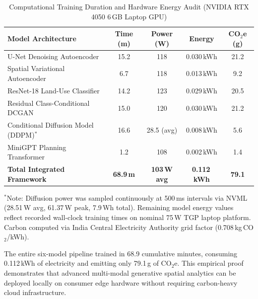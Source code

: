 \documentclass[journal]{IEEEtran}
\begin{document}
\begin{table}[htbp]
\caption{Computational Training Duration and Hardware Energy Audit (NVIDIA RTX 4050 6\,GB Laptop GPU)}
\centering
\scriptsize
\renewcommand{\arraystretch}{1.12}
\setlength{\tabcolsep}{3pt}
\begin{tabularx}{\columnwidth}{@{}X c c c c@{}}
\toprule
\textbf{Model Architecture} & \textbf{Time (m)} & \textbf{Power (W)} & \textbf{Energy} & \textbf{CO$_2$e (g)} \\
\midrule
U-Net Denoising Autoencoder & 15.2 & 118 & 0.030\,kWh & 21.2 \\
Spatial Variational Autoencoder & 6.7 & 118 & 0.013\,kWh & 9.2 \\
ResNet-18 Land-Use Classifier & 14.2 & 123 & 0.029\,kWh & 20.5 \\
Residual Class-Conditional DCGAN & 15.0 & 120 & 0.030\,kWh & 21.2 \\
Conditional Diffusion Model (DDPM)$^*$ & 16.6 & 28.5 (avg) & 0.008\,kWh & 5.6 \\
MiniGPT Planning Transformer & 1.2 & 108 & 0.002\,kWh & 1.4 \\
\midrule
\textbf{Total Integrated Framework} & \textbf{68.9\,m} & \textbf{103\,W avg} & \textbf{0.112\,kWh} & \textbf{79.1} \\
\bottomrule
\end{tabularx}
\label{tab:energy}
\vspace{2pt}
\raggedright\scriptsize $^*$Note: Diffusion power was sampled continuously at 500\,ms intervals via NVML (28.51\,W avg, 61.37\,W peak, 7.9\,Wh total). Remaining model energy values reflect recorded wall-clock training times on nominal 75\,W TGP laptop platform. Carbon computed via India Central Electricity Authority grid factor (0.708\,kg\,CO$_2$/kWh).\par
\end{table}

The entire six-model pipeline trained in 68.9 cumulative minutes, consuming 0.112\,kWh of electricity and emitting only 79.1\,g of CO$_2$e. This empirical proof demonstrates that advanced multi-modal generative spatial analytics can be deployed locally on consumer edge hardware without requiring carbon-heavy cloud infrastructure.
\end{document}
